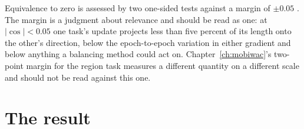 Equivalence to zero is assessed by two one-sided tests against a margin of $\pm 0.05$
\cite{lakens2017tost}. The margin is a judgment about relevance and should be read as one: at
$|\cos| < 0.05$ one task's update projects less than five percent of its length onto the other's
direction, below the epoch-to-epoch variation in either gradient and below anything a balancing
method could act on. Chapter~\ref{ch:mobiwac}'s two-point margin for the region task measures a
different quantity on a different scale and should not be read against this one.
%
%

\section{The result}
\label{apx:cosine:result}

